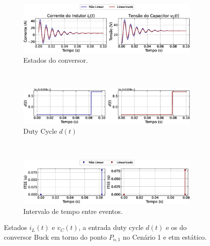 \begin{figure}[H]
  \centering
  \captionsetup{justification=centering}
  \begin{subfigure}{1.\textwidth}
    \centering
    \includegraphics[width=1.\textwidth]{figuras/static-etm/buck/sim1/op1/result.eps}
    \caption{Estados do conversor.}
    \label{fig:buck_converter_constant_pcpl_static_etm_op1_duty_a}
  \end{subfigure}
  \\[6pt]
  \begin{subfigure}{1.\textwidth}
    \centering
    \includegraphics[width=1.\textwidth]{figuras/static-etm/buck/sim1/op1/duty-cycle.eps}
    \caption{Duty Cycle $d(t)$}
    \label{fig:buck_converter_constant_pcpl_static_etm_op1_duty_b}
  \end{subfigure}
  \\[6pt]
  \begin{subfigure}{1.\textwidth}
    \centering
    \includegraphics[width=1.\textwidth]{figuras/static-etm/buck/sim1/op1/inter-event-times.eps}
    \caption{Intervalo de tempo entre eventos.}
    \label{fig:buck_converter_constant_pcpl_static_etm_op1_duty_c}
  \end{subfigure}
  \caption{Estados $i_L(t)$ e $v_C(t)$, a entrada duty cycle $d(t)$ e os  do conversor Buck em torno do ponto $P_{\mathrm{o}, 1}$ no Cenário 1  e \acrshort{etm} estático.}
\end{figure}

